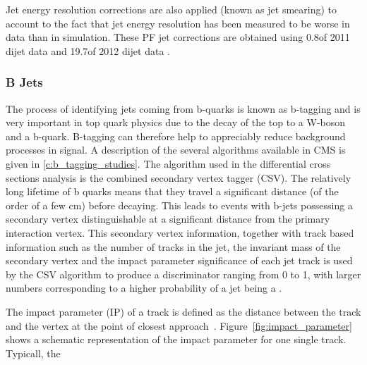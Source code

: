 Jet energy resolution corrections are also applied (known as jet smearing) to account to the fact that jet
energy resolution has been measured to be worse in data than in simulation. These PF jet corrections are
obtained using 0.8\fbinv of 2011 dijet data and 19.7\fbinv of 2012 dijet data
\cite{Chatrchyan:2011ds,jet_res_2012}.

\subsubsection{B Jets}
\label{sss:b_jets}
The process of identifying jets coming from b-quarks is known as b-tagging and is very important in top quark
physics due to the decay of the top to a W-boson and a b-quark. B-tagging can therefore help to appreciably
reduce background processes in signal. A description of the several algorithms available in CMS is given in
\ref{c:b_tagging_studies}. The algorithm used in the differential cross sections analysis is the combined
secondary vertex tagger (CSV). The relatively long lifetime of b quarks means that they travel a significant
distance (of the order of a few cm) before decaying. This leads to events with b-jets possessing a
secondary vertex distinguishable at a significant distance from the primary interaction vertex. This secondary vertex
information, together with track based information such as the number of tracks in the jet, the invariant
mass of the secondary vertex and the impact parameter significance of each jet track is used by the CSV
algorithm to produce a discriminator ranging from 0 to 1, with larger numbers corresponding to a higher
probability of a jet being a \bjet.

The impact parameter (IP) of a track is defined as the distance between the track and the vertex at the point
of closest approach~\cite{CMS-PAS-BTV-09-001}. Figure~\ref{fig:impact_parameter} shows a schematic
representation of the impact parameter for one single track. Typicall, the 

